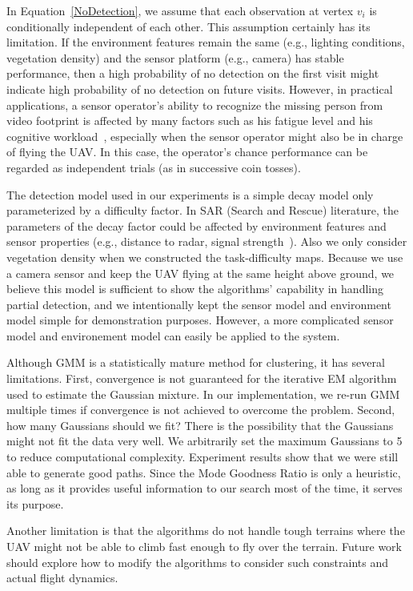 In Equation~\ref{NoDetection}, we assume that each observation at vertex $v_i$ is conditionally independent of each other. This assumption certainly has its limitation. If the environment features remain the same (e.g., lighting conditions, vegetation density) and the sensor platform (e.g., camera) has stable performance, then a high probability of no detection on the first visit might indicate high probability of no detection on future visits. However, in practical applications, a sensor operator's ability to recognize the missing person from video footprint is affected by many factors such as his fatigue level and his cognitive workload~\cite{Goodrich2008Supporting}, especially when the sensor operator might also be in charge of flying the UAV. In this case, the operator's chance performance can be regarded as independent trials (as in successive coin tosses).

The detection model used in our experiments is a simple decay model only parameterized by a difficulty factor. In SAR (Search and Rescue) literature, the parameters of the decay factor could be affected by environment features and sensor properties (e.g., distance to radar, signal strength~\cite{Bourgault2006Optimal}). Also we only consider vegetation density when we constructed the task-difficulty maps. Because we use a camera sensor and keep the UAV flying at the same height above ground, we believe this model is sufficient to show the algorithms' capability in handling partial detection, and we intentionally kept the sensor model and environment model simple for demonstration purposes. However, a more complicated sensor model and environement model can easily be applied to the system. 

Although GMM is a statistically mature method for clustering, it has several limitations. First, convergence is not guaranteed for the iterative EM algorithm used to estimate the Gaussian mixture. In our implementation, we re-run GMM multiple times if convergence is not achieved to overcome the problem. Second, how many Gaussians should we fit? There is the possibility that the Gaussians might not fit the data very well. We arbitrarily set the maximum Gaussians to 5 to reduce computational complexity. Experiment results show that we were still able to generate good paths. Since the Mode Goodness Ratio is only a heuristic, as long as it provides useful information to our search most of the time, it serves its purpose.

Another limitation is that the algorithms do not handle tough terrains where the UAV might not be able to climb fast enough to fly over the terrain. Future work should explore how to modify the algorithms to consider such constraints and actual flight dynamics.

